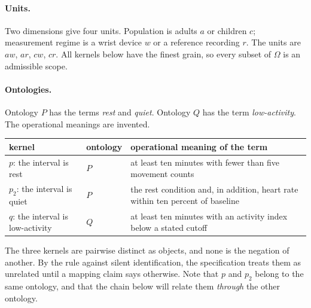 \documentclass[11pt]{article}
\newcommand{\Om}{\Omega}
\begin{document}
\paragraph{Units.} Two dimensions give four units. Population is adults $a$ or children $c$; measurement regime is a wrist device $w$ or a reference recording $r$. The units are $aw$, $ar$, $cw$, $cr$. All kernels below have the finest grain, so every subset of $\Om$ is an admissible scope.

\paragraph{Ontologies.} Ontology $P$ has the terms \emph{rest} and \emph{quiet}. Ontology $Q$ has the term \emph{low-activity}. The operational meanings are invented.
\begin{center}
\begin{tabularx}{\textwidth}{@{}llX@{}}
\toprule
kernel & ontology & operational meaning of the term\\
\midrule
$p$: the interval is rest & $P$ & at least ten minutes with fewer than five movement counts\\
$p_2$: the interval is quiet & $P$ & the rest condition and, in addition, heart rate within ten percent of baseline\\
$q$: the interval is low-activity & $Q$ & at least ten minutes with an activity index below a stated cutoff\\
\bottomrule
\end{tabularx}
\end{center}
The three kernels are pairwise distinct as objects, and none is the negation of another. By the rule against silent identification, the specification treats them as unrelated until a mapping claim says otherwise. Note that $p$ and $p_2$ belong to the same ontology, and that the chain below will relate them \emph{through} the other ontology.
\end{document}
